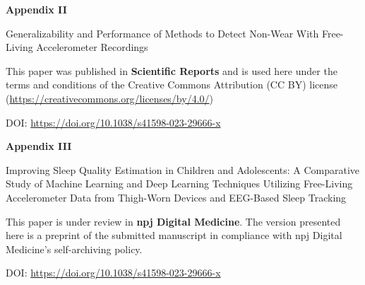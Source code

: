 \documentclass[
  9pt,
]{article}
\begin{document}
\begin{center}

\textbf{\textsf{\Huge Appendix II}}


\vspace{1cm}

\textsf{\Huge Generalizability and Performance of Methods to Detect Non-Wear With Free-Living Accelerometer Recordings}

\vspace{5cm}

This paper was published in \textbf{Scientific Reports} and is used here under the terms and conditions of the Creative Commons Attribution (CC BY) license (\href{https://creativecommons.org/licenses/by/4.0/}{https://creativecommons.org/licenses/by/4.0/})

\vspace{1cm}

DOI: \href{https://doi.org/10.1038/s41598-023-29666-x}{https://doi.org/10.1038/s41598-023-29666-x}

\end{center}



\begin{center}

\textbf{\textsf{\Huge Appendix III}}


\vspace{1cm}

\textsf{\Huge Improving Sleep Quality Estimation in Children and Adolescents: A Comparative Study of Machine Learning and Deep Learning Techniques Utilizing Free-Living Accelerometer Data from Thigh-Worn Devices and EEG-Based Sleep Tracking}

\vspace{5cm}

This paper is under review in \textbf{npj Digital Medicine}.
The version presented here is a preprint of the submitted manuscript in compliance with npj Digital Medicine's self-archiving policy.

\vspace{1cm}

DOI: \href{https://doi.org/10.1038/s41598-023-29666-x}{https://doi.org/10.1038/s41598-023-29666-x}

\end{center}


\end{document}
